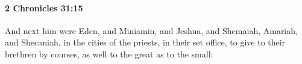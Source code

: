 
		\paragraph{2 Chronicles 31:15} %
			\label{2CHRONICLES-31-15}

			And next him were Eden, and Miniamin, and Jeshua, and Shemaiah, Amariah, and Shecaniah, in the cities of the priests, in their set office, to give to their brethren by courses, as well to the great as to the small:


